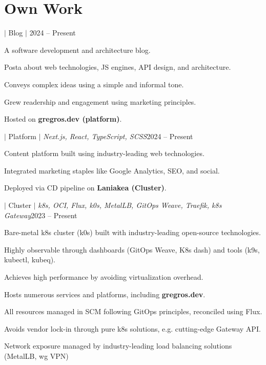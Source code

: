 \documentclass[a4paper,11pt]{article}
\begin{document}
\section{Own Work}
\begin{sectionList}
  \begin{project}{\textbf{\gregrosdev} $|$ Blog $|$
    \https{\mywebsite}}{2024 -- Present}
  \item A software development and architecture blog.
  \item Posta about web technologies, JS engines, API design, and architecture.
  \item Conveys complex ideas using a simple and informal tone.
  \item Grew readership and engagement using marketing principles.
  \item Hosted on \textbf{gregros.dev (platform)}.
  \end{project}
  \begin{project}{\textbf{\gregrosdev} $|$ Platform $|$
    \textit{Next.js, React, TypeScript, SCSS}}{2024 -- Present}
  \item Content platform built using industry-leading web technologies.
  \item Integrated marketing staples like Google Analytics, SEO, and social.
  \item Deployed via CD pipeline on \textbf{Laniakea (Cluster)}.
  \end{project}
  \begin{project}{\textbf{\laniakea} $|$ Cluster $|$ \textit{k8s,
        OCI, Flux, k0s, MetalLB, GitOps Weave, Traefik, k8s
    Gateway}}{2023 -- Present}
  \item Bare-metal k8s cluster (k0s) built with industry-leading
    open-source technologies.
  \item Highly observable through dashboards (GitOps Weave, K8s dash)
    and tools (k9s, kubectl, kubeq).
  \item Achieves high performance by avoiding virtualization overhead.
  \item Hosts numerous services and platforms, including \textbf{gregros.dev}.
  \item All resources managed in SCM following GitOps principles,
    reconciled using Flux.
  \item Avoids vendor lock-in through pure k8s solutions, e.g.
    cutting-edge Gateway API.
  \item Network exposure managed by industry-leading load balancing
    solutions (MetalLB, wg VPN)

\end{project}
\end{sectionList}
\end{document}
